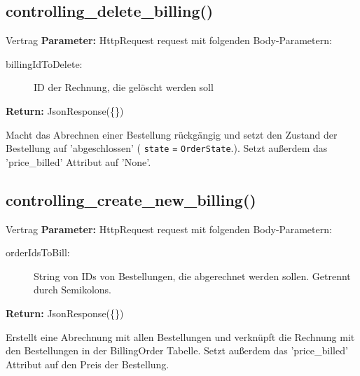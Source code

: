 \documentclass[12pt]{article}
\newcommand{\attribute}[1]{{\color{orange} \texttt{#1}}}
\newcommand{\orderState}[1]{{\color{red}\texttt{OrderState}\color{black}.\color{blue}{#1}}}
\newcommand{\insetContract}{12pt}
\newcommand{\insetMethodDescription}{-0.7cm}
\begin{document}
\subsection{controlling_delete_billing()}
\begin{contract}{Vertrag}
    \textbf{Parameter:} HttpRequest request mit folgenden Body-Parametern:
    \begin{description}
        \item[\hspace{\insetContract} billingIdToDelete:] ID der Rechnung, die gelöscht werden soll
    \end{description}
    \textbf{Return:} JsonResponse(\{\})
\end{contract}
\hspace{\insetMethodDescription{}}
Macht das Abrechnen einer Bestellung rückgängig und setzt den Zustand der Bestellung auf 'abgeschlossen' (\attribute{state} \texttt{=} \orderState{FINISHED}).
Setzt außerdem das 'price_billed' Attribut auf 'None'.


\subsection{controlling_create_new_billing()}
\begin{contract}{Vertrag}
    \textbf{Parameter:} HttpRequest request mit folgenden Body-Parametern:
    \begin{description}
    \item[\hspace{\insetContract} orderIdsToBill:] String von IDs von Bestellungen, die abgerechnet werden sollen. Getrennt durch Semikolons.
    \end{description}
    \textbf{Return:} JsonResponse(\{\})
\end{contract}
\hspace{\insetMethodDescription{}}
Erstellt eine Abrechnung mit allen Bestellungen und verknüpft die Rechnung mit den Bestellungen in der BillingOrder Tabelle.
Setzt außerdem das 'price_billed' Attribut auf den Preis der Bestellung.
\end{document}
